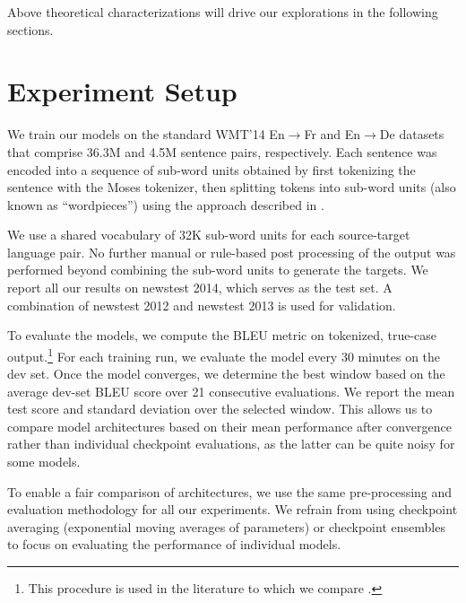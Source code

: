 \documentclass[11pt,a4paper]{article}
\begin{document}
Above theoretical characterizations will drive our explorations in the
following sections.



\section{Experiment Setup}
\label{sec:eval}
\vspace{-5px}
We train our models on the standard WMT'14 En$\rightarrow$Fr and En$\rightarrow$De
datasets that comprise 36.3M and 4.5M sentence pairs, respectively.
Each sentence was encoded into a sequence of sub-word units obtained
by first tokenizing the sentence with the Moses tokenizer, then splitting tokens into sub-word
units (also known as ``wordpieces'')  using the approach described in \cite{wordpiece_schuster}.

We use a shared vocabulary of 32K sub-word units for each
source-target language pair. No further manual or rule-based post
processing of the output was performed beyond combining the sub-word
units to generate the targets.  We report all our results on newstest
2014, which serves as the test set. A combination of newstest 2012 and
newstest 2013 is used for validation.

To evaluate the models, we compute the BLEU metric on tokenized, true-case
output.\footnote{This procedure is used in the literature to which we compare
  \cite{DBLP:journals/corr/GehringAGYD17,DBLP:journals/corr/WuSCLNMKCGMKSJL16}.}
For each training run, we evaluate the
model every 30 minutes on the dev set. Once the model converges, we
determine the best window based on the average dev-set BLEU score over
21 consecutive evaluations.
We report the mean test score and standard
deviation over the selected window. This allows us to compare model
architectures based on their mean performance after convergence rather than
individual checkpoint evaluations, as the latter can be quite noisy for some models.

To enable a fair comparison of architectures, we use the same pre-processing and
evaluation methodology for all our experiments. We refrain from using checkpoint
averaging (exponential moving averages of parameters) \cite{junczys2016amu} or
checkpoint ensembles \cite{jean2015using,DBLP:journals/corr/abs-1710-03282}
to focus on evaluating the performance of individual models.
\end{document}
